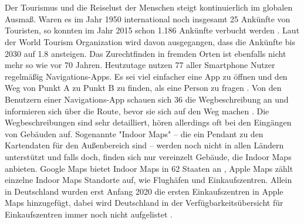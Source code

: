\chapter{
}

\section{
}
Der Tourismus und die Reiselust der Menschen steigt kontinuierlich im globalen Ausmaß. Waren es im Jahr 1950 international noch insgesamt \SI{25}{\mio} Ankünfte von Touristen, so konnten im Jahr 2015 schon \SI{1.186}{\mrd} Ankünfte verbucht werden \cite{GLA2017}. Laut der World Tourism Organization wird davon ausgegangen, dass die Ankünfte bis 2030 auf \SI{1.8}{\mrd} ansteigen. Das Zurechtfinden in fremden Orten ist ebenfalls nicht mehr so wie vor 70 Jahren. Heutzutage nutzen \SI{77}{\prc} aller Smartphone Nutzer regelmäßig Navigations-Apps. Es sei viel einfacher eine App zu öffnen und den Weg von Punkt A zu Punkt B zu finden, als eine Person zu fragen \cite{PAN2018}.%
%
Von den Benutzern einer Navigations-App schauen sich \SI{36}{\prc} die Wegbeschreibung an und informieren sich über die Route, bevor sie sich auf den Weg machen \cite{PAN2018}. Die Wegbeschreibungen sind sehr detailliert, hören allerdings oft bei den Eingängen von Gebäuden auf. Sogenannte "Indoor Maps" – die ein Pendant zu den Kartendaten für den Außenbereich sind – werden noch nicht in allen Ländern unterstützt und falls doch, finden sich nur vereinzelt Gebäude, die Indoor Maps anbieten. Google Maps bietet Indoor Maps in 62 Staaten an \cite{GOO2020}, Apple Maps zählt einzelne Indoor Maps Standorte auf, wie Flughäfen und Einkaufszentren. Allein in Deutschland wurden erst Anfang 2020 die ersten Einkaufszentren in Apple Maps hinzugefügt, dabei wird Deutschland in der Verfügbarkeitsübersicht für Einkaufszentren immer noch nicht aufgelistet \cite{OES2020}.%
%
\section{
}


